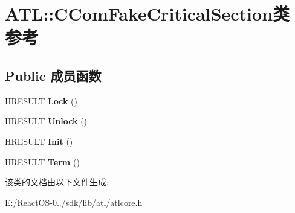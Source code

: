\hypertarget{class_a_t_l_1_1_c_com_fake_critical_section}{}\section{A\+TL\+:\+:C\+Com\+Fake\+Critical\+Section类 参考}
\label{class_a_t_l_1_1_c_com_fake_critical_section}
\subsection*{Public 成员函数}
\begin{DoxyCompactItemize}
\item 
\mbox{\label{class_a_t_l_1_1_c_com_fake_critical_section_a1d38800ce1cab556d1cae5dd0ee29354}} 
H\+R\+E\+S\+U\+LT {\bfseries Lock} ()
\item 
\mbox{\label{class_a_t_l_1_1_c_com_fake_critical_section_ac1a317b9e06d786ee1860ba7f62ba881}} 
H\+R\+E\+S\+U\+LT {\bfseries Unlock} ()
\item 
\mbox{\label{class_a_t_l_1_1_c_com_fake_critical_section_a2363bc85d7f7620bbe6ed564e071bd48}} 
H\+R\+E\+S\+U\+LT {\bfseries Init} ()
\item 
\mbox{\label{class_a_t_l_1_1_c_com_fake_critical_section_aecc53d5b41a204fa273814e1667950cc}} 
H\+R\+E\+S\+U\+LT {\bfseries Term} ()
\end{DoxyCompactItemize}


该类的文档由以下文件生成\+:\begin{DoxyCompactItemize}
\item 
E\+:/\+React\+O\+S-\/0../sdk/lib/atl/atlcore.\+h\end{DoxyCompactItemize}
